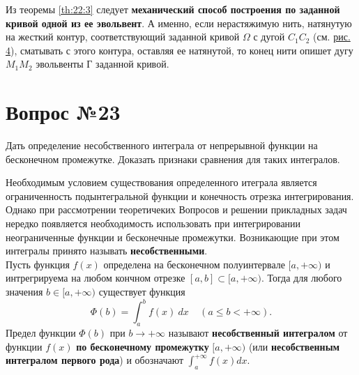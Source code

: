 \documentclass[12pt]{report}
\numberwithin{equation}{section}
\begin{document}
Из теоремы \ref{th:22:3} следует \textbf{механический способ построения по заданной кривой одной из ее эвольвент}. А именно, если нерастяжимую нить, натянутую на жесткий контур, соответствующий заданной кривой $\Omega$ с дугой $C_1 C_2$ (см. \hyperref[pic:22:2]{рис. 4}), сматывать с этого контура, оставляя ее натянутой, то конец нити опишет дугу $M_1 M_2$ эвольвенты Г заданной кривой.

\newpage \section{Вопрос №23} %
\begin{framed}
Дать определение несобственного интеграла от непрерывной функции на бесконечном промежутке. Доказать признаки сравнения для таких интегралов.
\end{framed}

Необходимым условием существования определенного итеграла является ограниченность подынтегральной функции и конечность отрезка интегрирования. Однако при рассмотрении теоретичеких Вопросов и решении прикладных задач нередко появляется необходимость использовать при интегрировании неограниченные функции и бесконечные промежутки. Возникающие при этом интегралы принято называть \textbf{несобственными}.\\

Пусть функция $f(x)$ определена на бесконечном полуинтервале $[a, +\infty)$ и интрегрируема на любом кончном отрезке $[a,b] \subset [a, + \infty)$. Тогда для любого значения $b \in [a, + \infty)$ существует функция
\[ \Phi(b) = \int_a^b f(x)~dx~~~~~(a \leqslant b < + \infty).\]
Предел функции $\Phi(b)$ при $b \to + \infty$ называют \textbf{несобственный интегралом} от функции $f(x)$ \textbf{по бесконечному промежутку} $[a, + \infty)$ (или \textbf{несобственным интегралом первого рода}) и обозначают $\int_a^{+ \infty} f(x)dx$.
\end{document}
